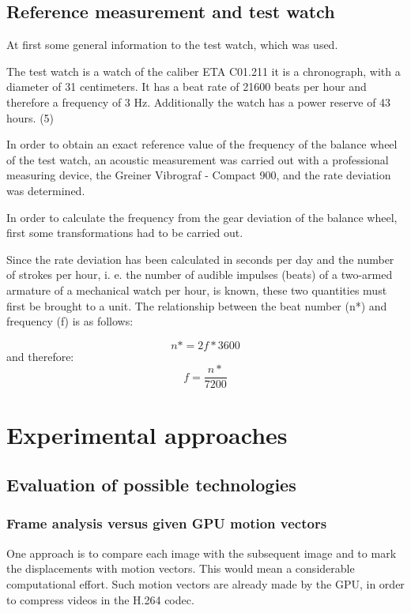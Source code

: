 \documentclass[12pt, a4paper]{report}
\begin{document}
\section{Reference measurement and test watch}
At first some general information to the test watch, which was used.

The test watch is a watch of the caliber ETA C01.211 it is a chronograph, with a diameter of 31 centimeters. It has a beat rate of 21600 beats per hour and therefore a frequency of 3 Hz. Additionally the watch has a power reserve of 43 hours. (5)

In order to obtain an exact reference value of the frequency of the balance wheel of the test watch, an acoustic measurement was carried out with a professional measuring device, the Greiner Vibrograf - Compact 900, and the rate deviation was determined. 

In order to calculate the frequency from the gear deviation of the balance wheel, first some transformations had to be carried out. 

Since the rate deviation has been calculated in seconds per day and the number of strokes per hour, i. e. the number of audible impulses (beats) of a two-armed armature of a mechanical watch per hour, is known, these two quantities must first be brought to a unit. The relationship between the beat number (n*) and frequency (f) is as follows: 

\begin{displaymath}
n* = 2f*3600
 \end{displaymath}
 and therefore:
 \begin{displaymath}
  f = \frac{n*}{7200}
 \end{displaymath}

\chapter {Experimental approaches}

\section {Evaluation of possible technologies}
\subsection{Frame analysis versus given GPU motion vectors}
One approach is to compare each image with the subsequent image and to mark the displacements with motion vectors. This would mean a considerable computational effort.
Such motion vectors are already made by the GPU, in order to compress videos in the H.264 codec.
\end{document}
